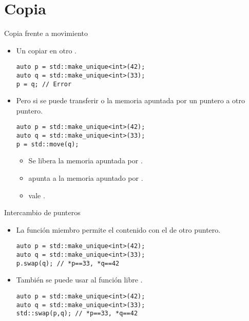\section{Copia}

\begin{frame}[t,fragile]{Copia frente a movimiento}
\begin{itemize}
  \item Un   copiar en otro
        .
\begin{lstlisting}
auto p = std::make_unique<int>(42);
auto q = std::make_unique<int>(33);
p = q; // Error
\end{lstlisting}

  \item Pero si se puede transferir o  la memoria 
        apuntada por un puntero a otro puntero.
\begin{lstlisting}
auto p = std::make_unique<int>(42);
auto q = std::make_unique<int>(33);
p = std::move(q);
\end{lstlisting}
    
    \begin{itemize}
      \item Se libera la memoria apuntada por .
      \item {} apunta a la memoria apuntado por .
      \item {} vale .
    \end{itemize}
\end{itemize}
\end{frame}

\begin{frame}[t,fragile]{Intercambio de punteros}
\begin{itemize}
  \item La función miembro  permite  el contenido
        con el de otro puntero.
\begin{lstlisting}
auto p = std::make_unique<int>(42);
auto q = std::make_unique<int>(33);
p.swap(q); // *p==33, *q==42
\end{lstlisting}

  \item También se puede usar al función libre .
\begin{lstlisting}
auto p = std::make_unique<int>(42);
auto q = std::make_unique<int>(33);
std::swap(p,q); // *p==33, *q==42
\end{lstlisting}

\end{itemize}
\end{frame}
